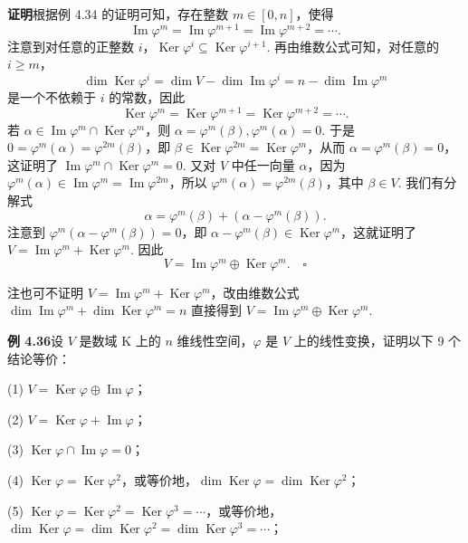 \documentclass[UTF8, 12pt, fontset=fandol, oneside]{ctexart}
\begin{document}
\noindent\textbf{证明}\quad 根据例 4.34 的证明可知，存在整数 $m\in[0,n]$，使得
\[
\operatorname{Im}\varphi^m=\operatorname{Im}\varphi^{m+1}=\operatorname{Im}\varphi^{m+2}=\cdots.
\]
注意到对任意的正整数 $i$，$\operatorname{Ker}\varphi^i\subseteq\operatorname{Ker}\varphi^{i+1}$. 再由维数公式可知，对任意的 $i\ge m$，
\[
\dim\operatorname{Ker}\varphi^i=\dim V-\dim\operatorname{Im}\varphi^i=n-\dim\operatorname{Im}\varphi^m
\]
是一个不依赖于 $i$ 的常数，因此
\[
\operatorname{Ker}\varphi^m=\operatorname{Ker}\varphi^{m+1}=\operatorname{Ker}\varphi^{m+2}=\cdots.
\]
若 $\alpha\in\operatorname{Im}\varphi^m\cap\operatorname{Ker}\varphi^m$，则 $\alpha=\varphi^m(\beta),\varphi^m(\alpha)=0$. 于是 $0=\varphi^m(\alpha)=\varphi^{2m}(\beta)$，即 $\beta\in\operatorname{Ker}\varphi^{2m}=\operatorname{Ker}\varphi^m$，从而 $\alpha=\varphi^m(\beta)=0$，这证明了 $\operatorname{Im}\varphi^m\cap\operatorname{Ker}\varphi^m=0$. 又对 $V$ 中任一向量 $\alpha$，因为 $\varphi^m(\alpha)\in\operatorname{Im}\varphi^m=\operatorname{Im}\varphi^{2m}$，所以 $\varphi^m(\alpha)=\varphi^{2m}(\beta)$，其中 $\beta\in V$. 我们有分解式
\[
\alpha=\varphi^m(\beta)+(\alpha-\varphi^m(\beta)).
\]
注意到 $\varphi^m(\alpha-\varphi^m(\beta))=0$，即 $\alpha-\varphi^m(\beta)\in\operatorname{Ker}\varphi^m$，这就证明了 $V=\operatorname{Im}\varphi^m+\operatorname{Ker}\varphi^m$. 因此
\[
V=\operatorname{Im}\varphi^m\oplus\operatorname{Ker}\varphi^m. \quad \square
\]

注\quad 也可不证明 $V=\operatorname{Im}\varphi^m+\operatorname{Ker}\varphi^m$，改由维数公式 $\dim\operatorname{Im}\varphi^m+\dim\operatorname{Ker}\varphi^m=n$ 直接得到 $V=\operatorname{Im}\varphi^m\oplus\operatorname{Ker}\varphi^m$.

\noindent\textbf{例 4.36}\quad 设 $V$ 是数域 $\mathrm{K}$ 上的 $n$ 维线性空间，$\varphi$ 是 $V$ 上的线性变换，证明以下 9 个结论等价：

(1) $V=\operatorname{Ker}\varphi\oplus\operatorname{Im}\varphi$；

(2) $V=\operatorname{Ker}\varphi+\operatorname{Im}\varphi$；

(3) $\operatorname{Ker}\varphi\cap\operatorname{Im}\varphi=0$；

(4) $\operatorname{Ker}\varphi=\operatorname{Ker}\varphi^2$，或等价地，$\dim\operatorname{Ker}\varphi=\dim\operatorname{Ker}\varphi^2$；

(5) $\operatorname{Ker}\varphi=\operatorname{Ker}\varphi^2=\operatorname{Ker}\varphi^3=\cdots$，或等价地，$\dim\operatorname{Ker}\varphi=\dim\operatorname{Ker}\varphi^2=\dim\operatorname{Ker}\varphi^3=\cdots$；
\end{document}

